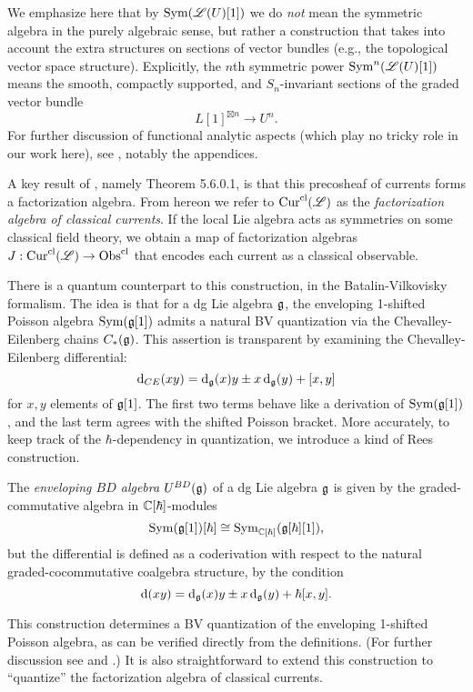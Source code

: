 We emphasize here that by ${\rm Sym}(\mathscr L(U)[1])$ we do {\em not} mean the symmetric algebra in the purely algebraic sense, but rather a construction that takes into account the extra structures on sections of vector bundles (e.g., the topological vector space structure).
Explicitly, the $n$th symmetric power  ${\rm Sym}^n(\mathscr L(U)[1])$ means the smooth, compactly supported, and $S_n$-invariant sections of the graded vector bundle 
\[
L[1]^{\boxtimes n} \to U^n.
\]
For further discussion of functional analytic aspects (which play no tricky role in our work here),
see \cite{CG1}, notably the appendices.

A key result of \cite{CG1}, namely Theorem 5.6.0.1, is that this precosheaf of currents forms a factorization algebra. 
From hereon we refer to  ${\rm Cur}^{\rm cl}(\mathscr L)$ as the {\em factorization algebra of classical currents}.
If the local Lie algebra acts as symmetries on some classical field theory,
we obtain a map of factorization algebras $J: {\rm Cur}^{\rm cl}(\mathscr L) \to {\rm Obs}^{\rm cl}$ that encodes each current as a classical observable.

There is a quantum counterpart to this construction, in the Batalin-Vilkovisky formalism.
The idea is that for a dg Lie algebra $\mathfrak g$, 
the enveloping 1-shifted Poisson algebra ${\rm Sym}(\mathfrak g[1])$ admits a natural BV quantization via the Chevalley-Eilenberg chains $C_*(\mathfrak g)$.  
This assertion is transparent by examining the Chevalley-Eilenberg differential:
\[
{\rm d}_{CE}(xy) = {\rm d}_\mathfrak g(x)y \pm x\, {\rm d}_\mathfrak g(y) + [x,y]
\]
for $x,y$ elements of $\mathfrak g[1]$.
The first two terms behave like a derivation of ${\rm Sym}(\mathfrak g[1])$, 
and the last term agrees with the shifted Poisson bracket.
More accurately, to keep track of the $\hbar$-dependency in quantization,
we introduce a kind of Rees construction.

\begin{dfn}
\label{def: BD envelope}
The {\em enveloping $BD$ algebra} $U^{BD}(\mathfrak g)$ of a dg Lie algebra $\mathfrak g$ is given by the graded-commutative algebra in $\mathbb C[\hbar]$-modules
\[
{\rm Sym}(\mathfrak g[1])[\hbar] \cong {\rm Sym}_{\mathbb C[\hbar]}(\mathfrak g[\hbar][1]),
\]
but the differential is defined as a coderivation with respect to the natural graded-cocommutative coalgebra structure,
by the condition
\[
{\rm d}(xy) = {\rm d}_\mathfrak g(x)y \pm x\, {\rm d}_\mathfrak g(y) + \hbar [x,y].
\]
\end{dfn}

This construction determines a BV quantization of the enveloping 1-shifted Poisson algebra,
as can be verified directly from the definitions.
(For further discussion see \cite{GH} and \cite{CG2}.)
It is also straightforward to extend this construction to ``quantize'' the factorization algebra of classical currents.

